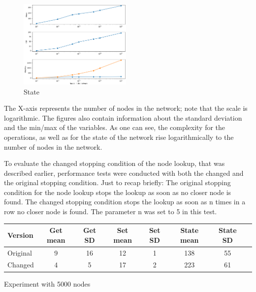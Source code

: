 \documentclass[a4paper, 12pt]{article} %
\begin{document}
\begin{figure}
    \begin{center}
        \includegraphics[width=0.49\textwidth]{images/state_figure.png}
    \end{center}
    \caption{State}
\end{figure}

The X-axis represents the number of nodes in the network; note that the scale is logarithmic. The figures also contain information about the standard deviation and the min/max of the variables. As one can see, the complexity for the operations, as well as for the state of the network rise logarithmically to the number of nodes in the network. 

\clearpage

To evaluate the changed stopping condition of the node lookup, that was described earlier, performance tests were conducted with both the changed and the original stopping condition. Just to recap briefly: The original stopping condition for the node lookup stops the lookup as soon as no closer node is found. The changed stopping condition stops the lookup as soon as n times in a row no closer node is found. The parameter n was set to 5 in this test. 

\begin{table}[h]
\centering
\begin{tabular}{l*{6}{c}r}
Version           & Get mean & Get SD & Set mean & Set SD & State mean & State SD \\
\hline
Original          & 9        & 16     & 12       & 1      & 138        & 55       \\
Changed           & 4        & 5      & 17       & 2      & 223        & 61       \\
\end{tabular}
  \begin{tablenotes}
    \small
    \item Experiment with 5000 nodes
  \end{tablenotes}
\end{table}
\end{document}

